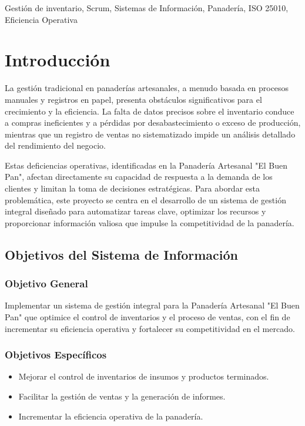 \documentclass[conference]{IEEEtran}
\begin{document}
\begin{IEEEkeywords}
Gestión de inventario, Scrum, Sistemas de Información, Panadería, ISO 25010, Eficiencia Operativa
\end{IEEEkeywords}

\section{Introducción}
La gestión tradicional en panaderías artesanales, a menudo basada en procesos manuales y registros en papel, presenta obstáculos significativos para el crecimiento y la eficiencia. La falta de datos precisos sobre el inventario conduce a compras ineficientes y a pérdidas por desabastecimiento o exceso de producción, mientras que un registro de ventas no sistematizado impide un análisis detallado del rendimiento del negocio.

Estas deficiencias operativas, identificadas en la Panadería Artesanal "El Buen Pan", afectan directamente su capacidad de respuesta a la demanda de los clientes y limitan la toma de decisiones estratégicas. Para abordar esta problemática, este proyecto se centra en el desarrollo de un sistema de gestión integral diseñado para automatizar tareas clave, optimizar los recursos y proporcionar información valiosa que impulse la competitividad de la panadería.

\subsection{Objetivos del Sistema de Información}
\subsubsection{Objetivo General}
Implementar un sistema de gestión integral para la Panadería Artesanal "El Buen Pan" que optimice el control de inventarios y el proceso de ventas, con el fin de incrementar su eficiencia operativa y fortalecer su competitividad en el mercado.
\subsubsection{Objetivos Específicos}
\begin{itemize}
    \item Mejorar el control de inventarios de insumos y productos terminados.
    \item Facilitar la gestión de ventas y la generación de informes.
    \item Incrementar la eficiencia operativa de la panadería.
\end{itemize}
\end{document}
